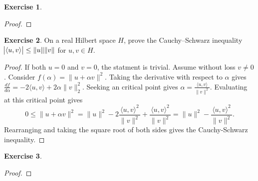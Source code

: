\documentclass{amsart}
\theoremstyle{plain}
\theoremstyle{definition}
\newtheorem{exer}{Exercise}[section]
\begin{document}
\begin{exer}
    
\end{exer}
\begin{proof}
    
\end{proof}

\begin{exer}
    On a real Hilbert space $H$, prove the Cauchy–Schwarz inequality $\abs{\langle u, v\rangle}\leq \|u\|\|v\|$ for $u,v\in H.$
\end{exer}
\begin{proof}
If both $u = 0$ and $v= 0$, the statment is trivial. Assume without loss $v \neq 0$. Consider $f(\alpha) = \|u+\alpha v\|^2.$ Taking the derivative with respect to $\alpha$ gives $\frac{df}{d\alpha} = -2\langle u,v\rangle + 2\alpha \|v\|_{2}^{2}.$ Seeking an critical point gives $\alpha = \frac{\langle u,v\rangle}{\|v\|^2}.$ Evaluating at this critical point gives 
$$0\leq \|u+\alpha v\|^2 = \|u\|^2 - 2\frac{\langle u,v\rangle^2}{\|v\|^2}+\frac{\langle u,v\rangle^2}{\|v\|^2} = \|u\|^2 - \frac{\langle u,v\rangle^2}{\|v\|^2}.$$
Rearranging and taking the square root of both sides gives the Cauchy-Schwarz inequality.
\end{proof}

\begin{exer}
    
\end{exer}
\begin{proof}
    
\end{proof}

\printbibliography
\end{document}

